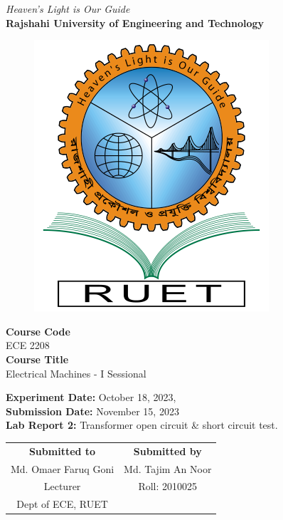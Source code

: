 \vspace*{\fill}
\begin{center}

    \emph{Heaven's Light is Our Guide} \\
    \textbf{Rajshahi University of Engineering and Technology} \\

    \begin{figure}[h]
        \centering
        \includegraphics[scale=.34]{images/RUET_logo.png}
        \label{fig:ruet_logo}
    \end{figure}
    \vspace{5mm}

    \textbf{Course Code}\\
    ECE 2208\\
    \vspace{3mm}
    \textbf{Course Title}\\
    Electrical Machines - I Sessional

    \vspace{5mm}
    \textbf{Experiment Date:} {October 18, 2023,}\\
    \textbf{Submission Date:} {November 15, 2023}\\

    \vspace{5mm}
    \textbf{Lab Report 2:} Transformer open circuit \& short circuit test.\\

    \vspace{15mm}

    \begin{tabular}{c|c}
        \textbf{Submitted to} & \textbf{Submitted by} \\
        Md. Omaer Faruq Goni  & Md. Tajim An Noor     \\
        Lecturer              & Roll: 2010025         \\
        Dept of ECE, RUET     &                       \\
    \end{tabular}

\end{center}
\vspace*{\fill}
